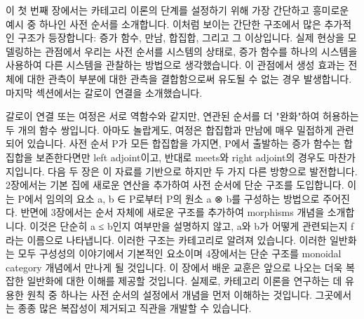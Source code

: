 \documentclass[11pt, a4paper, twoside, openany]{book}
\begin{document}
\par\medskip
이 첫 번째 장에서는 카테고리 이론의 단계를 설정하기 위해 가장 간단하고 흥미로운 예시 중 하나인 사전 순서를 소개합니다. 이처럼 보이는 간단한 구조에서 많은 추가적인 구조가 등장합니다: 증가 함수, 만남, 합집합, 그리고 그 이상입니다. 실제 현상을 모델링하는 관점에서 우리는 사전 순서를 시스템의 상태로, 증가 함수를 하나의 시스템을 사용하여 다른 시스템을 관찰하는 방법으로 생각했습니다. 이 관점에서 생성 효과는 전체에 대한 관측이 부분에 대한 관측을 결합함으로써 유도될 수 없는 경우 발생합니다.
마지막 섹션에서는 갈로이 연결을 소개했습니다.

\par\medskip
갈로이 연결 또는 여정은 서로 역함수와 같지만, 연관된 순서를 더 "완화"하여 허용하는 두 개의 함수 쌍입니다. 아마도 놀랍게도, 여정은 합집합과 만남에 매우 밀접하게 관련되어 있습니다. 사전 순서 P\hspace{0pt}가 모든 합집합을 가지면, P\hspace{0pt}에서 출발하는 증가 함수는 합집합을 보존한다면만 left adjoint\hspace{0pt}이고, 반대로 meets\hspace{0pt}와 right adjoint\hspace{0pt}의 경우도 마찬가지입니다.
다음 두 장은 이 자료를 기반으로 하지만 두 가지 다른 방향으로 발전합니다. 2\hspace{0pt}장에서는 기본 집에 새로운 연산을 추가하여 사전 순서에 단순 구조를 도입합니다. 이는 P\hspace{0pt}에서 임의의 요소 a, b ∈ P\hspace{0pt}로부터 P\hspace{0pt}의 원소 a ⊗ b\hspace{0pt}를 구성하는 방법으로 주어진다. 반면에 3\hspace{0pt}장에서는 순서 자체에 새로운 구조를 추가하여 morphisms 개념을 소개합니다. 이것은 단순히 a ≤ b\hspace{0pt}인지 여부만을 설명하지 않고, a\hspace{0pt}와 b\hspace{0pt}가 어떻게 관련되는지 f\hspace{0pt}라는 이름으로 나타냅니다. 이러한 구조는 카테고리로 알려져 있습니다. 이러한 일반화는 모두 구성성의 이야기에서 기본적인 요소이며 4\hspace{0pt}장에서는 단순 구조를 monoidal category 개념에서 만나게 될 것입니다. 이 장에서 배운 교훈은 앞으로 나오는 더욱 복잡한 일반화에 대한 이해를 제공할 것입니다. 실제로, 카테고리 이론을 연구하는 데 유용한 원칙 중 하나는 사전 순서의 설정에서 개념을 먼저 이해하는 것입니다. 그곳에서는 종종 많은 복잡성이 제거되고 직관을 개발할 수 있습니다.
\end{document}
